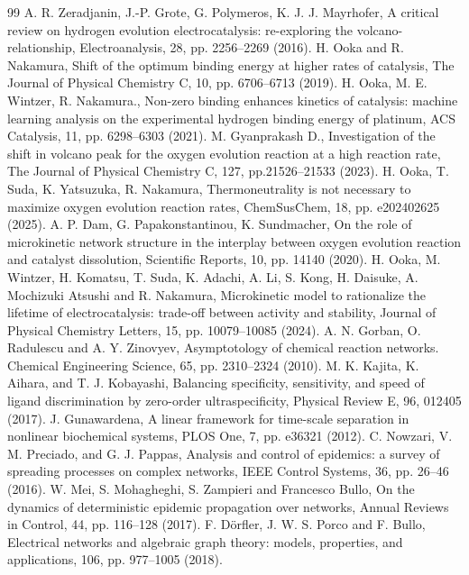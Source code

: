\documentclass[11pt,a4paper]{article}
\begin{document}
\begin{thebibliography}{99}
A. R. Zeradjanin, J.-P. Grote, G. Polymeros, K. J. J. Mayrhofer, A critical review on hydrogen evolution electrocatalysis: re-exploring the volcano-relationship, Electroanalysis, 28, pp. 2256--2269 (2016).
%
H. Ooka and R. Nakamura, Shift of the optimum binding energy at higher rates of catalysis, The Journal of Physical Chemistry C, 10, pp. 6706--6713 (2019).
%
H. Ooka, M. E. Wintzer, R. Nakamura., Non-zero binding enhances kinetics of catalysis: machine learning analysis on the experimental hydrogen binding energy of platinum, ACS Catalysis, 11, pp. 6298--6303 (2021).
%
M. Gyanprakash D., Investigation of the shift in volcano peak for the oxygen evolution reaction at a high reaction rate, The Journal of Physical Chemistry C, 127, pp.21526--21533 (2023).
%
H. Ooka, T. Suda, K. Yatsuzuka, R. Nakamura, Thermoneutrality is not necessary to maximize oxygen evolution reaction rates, ChemSusChem, 18, pp. e202402625 (2025).
%
A. P. Dam, G. Papakonstantinou, K. Sundmacher, On the role of microkinetic network structure in the interplay between oxygen evolution reaction and catalyst dissolution, Scientific Reports, 10, pp. 14140 (2020).
%
H. Ooka, M. Wintzer, H. Komatsu, T. Suda, K. Adachi, A. Li, S. Kong, H. Daisuke, A. Mochizuki Atsushi and R. Nakamura, Microkinetic model to rationalize the lifetime of electrocatalysis: trade-off between activity and stability, Journal of Physical Chemistry Letters, 15, pp. 10079--10085 (2024). 
%
A. N. Gorban, O. Radulescu and A. Y. Zinovyev, Asymptotology of chemical reaction networks. Chemical Engineering Science, 65, pp. 2310--2324 (2010).
%
M. K. Kajita, K. Aihara, and T. J. Kobayashi, Balancing specificity, sensitivity, and speed of ligand discrimination by zero-order ultraspecificity, Physical Review E, 96, 012405 (2017).
%
J. Gunawardena, A linear framework for time-scale separation in nonlinear biochemical systems, PLOS One, 7, pp. e36321 (2012).
%
C. Nowzari, V. M. Preciado, and G. J. Pappas, Analysis and control of epidemics: a survey of spreading processes on complex networks, IEEE Control Systems, 36, pp. 26--46 (2016).
%
W. Mei, S. Mohagheghi, S. Zampieri and Francesco Bullo, On the dynamics of deterministic epidemic propagation over networks, Annual Reviews in Control, 44, pp. 116--128 (2017).
%
F. Dörfler, J. W. S. Porco and F. Bullo, Electrical networks and algebraic graph theory: models, properties, and applications, 106, pp. 977--1005 (2018).

\end{thebibliography}
\end{document}
